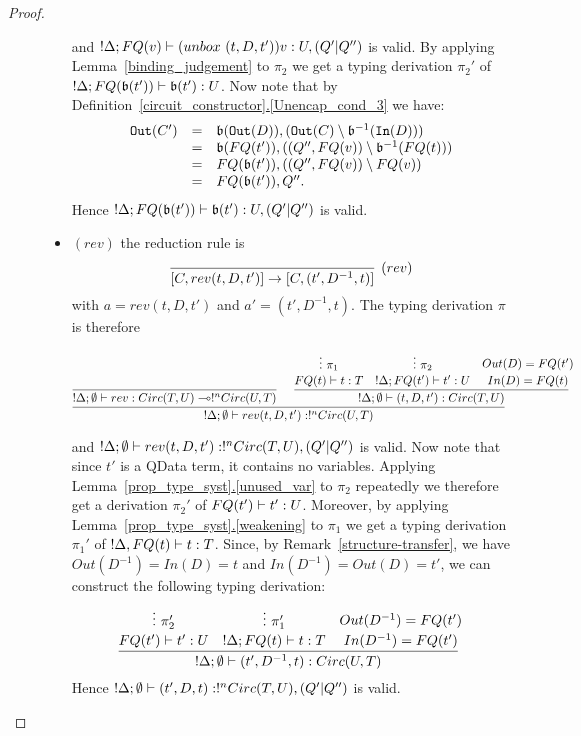 \documentclass{article}
\begin{document}
\begin{proof}
\begin{description}
\begin{itemize}
  and $!\Delta; FQ(v)\vdash (unbox~(t,D,t'))v :U,(Q'|Q'')$ 
  is valid. By applying
  Lemma~\hyperref[binding_judgement]{\ref*{binding_judgement}} 
  to $\pi_2$ we get a typing derivation $\pi_2'$ of 
  $!\Delta;FQ(\mathfrak{b}(t'))\vdash \mathfrak{b}(t'):U$.
  Now note that by 
  Definition~\hyperref[Unencap_cond_3]{\ref*{circuit_constructor}.\ref*{Unencap_cond_3}} 
  we have:
  \[
  \begin{array}{rcl}
  \mathtt{Out}(C') & = & \mathfrak{b}(\mathtt{Out}(D)), (\mathtt{Out}(C)\setminus\mathfrak{b}^{-1}(\mathtt{In}(D))) \\
                   & = & \mathfrak{b}(FQ(t')) , ((Q'',FQ(v))\setminus \mathfrak{b}^{-1}(FQ(t))) \\
                   & = & FQ(\mathfrak{b}(t')) , ((Q'',FQ(v))\setminus FQ(v)) \\
                   & = & FQ(\mathfrak{b}(t')),Q''.                   
  \end{array}
  \]
  Hence $!\Delta; FQ(\mathfrak{b}(t'))\vdash \mathfrak{b}(t') :U,(Q'|Q'')$  is valid.
  \item $(rev)$ the reduction rule is
  \[
    \infer[(rev)]{[C,rev (t,D,t')]\to [C,(t',D^{-1},t)]}{}
  \]
  with $a=rev(t,D,t')$ and $a'=(t',D^{-1},t)$. The typing derivation $\pi$ 
  is therefore
  \begin{changemargin}{-2.7cm}{-1.6cm}
  \[
  \infer[]{!\Delta;\emptyset\entails rev(t,D,t'):!^nCirc(U,T)}{
    \infer[]{!\Delta;\emptyset \entails rev:Circ(T,U)\loli !^nCirc(U,T)}{
    }   
    &
    \infer[]{!\Delta ;\emptyset\entails (t,D,t'):Circ(T,U)}{
      \deduce[]{FQ(t)\entails t:T}{
        \vdots ~\pi_1
      }
      &
      \deduce[]{!\Delta;FQ(t')\entails t':U}{
        \vdots ~\pi_2     
      }
      &
      \deduce[]{In(D)=FQ(t)}{
        Out(D)=FQ(t')
      }
    }
  }
  \]
  \end{changemargin}
  and $!\Delta;\emptyset\vdash rev(t,D,t'):!^nCirc(T,U),(Q'|Q'')$ is 
  valid. Now note that since $t'$ is a QData term, it contains no variables. 
  Applying Lemma~\hyperref[unused_var]{\ref*{prop_type_syst}.\ref*{unused_var}} 
  to $\pi_2$ repeatedly we therefore get a derivation $\pi_2'$ of 
  $FQ(t')\vdash t':U$. Moreover, by applying
  Lemma~\hyperref[weakening]{\ref*{prop_type_syst}.\ref*{weakening}} to $\pi_1$ 
  we get a typing derivation $\pi_1'$ of $!\Delta ,FQ(t)\vdash t:T$.
  Since, by 
  Remark~\hyperref[structure-transfer]{\ref*{structure-transfer}}, 
  we have $Out(D^{-1})=In(D)=t$ and $In(D^{-1})=Out(D)=t'$, we can construct 
  the following typing derivation:
  \[
  \infer[]{!\Delta ;\emptyset\entails (t',D^{-1},t):Circ(U,T)}{
    \deduce[]{FQ(t')\entails t':U}{
      \vdots ~\pi_2'
    }
    &
    \deduce[]{!\Delta;FQ(t)\entails t:T}{
      \vdots ~\pi_1'     
    }
    &
    \deduce[]{In(D^{-1})=FQ(t')}{
      Out(D^{-1})=FQ(t')
    }
  }  
  \]
  Hence $!\Delta;\emptyset\vdash (t',D,t):!^nCirc(T,U),(Q'|Q'')$ 
  is valid.    
\end{itemize}
\end{description}
\end{proof}
\end{document}
